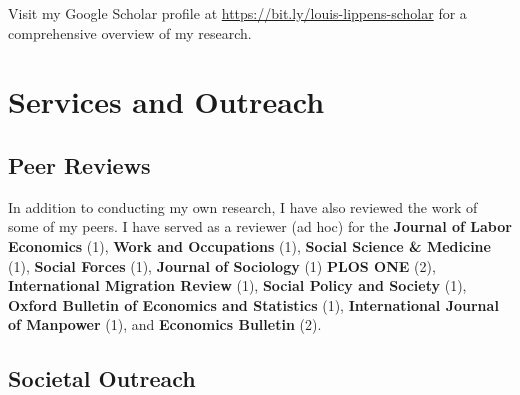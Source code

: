 \documentclass[11pt,a4paper,]{awesome-cv}
\begin{document}
\scriptsize

Visit my Google Scholar profile at
\url{https://bit.ly/louis-lippens-scholar} for a comprehensive overview
of my research. \normalsize

\hypertarget{services-and-outreach}{%
\section{Services and Outreach}\label{services-and-outreach}}

\medskip

\hypertarget{peer-reviews}{%
\subsection{Peer Reviews}\label{peer-reviews}}

\footnotesize

In addition to conducting my own research, I have also reviewed the work
of some of my peers. I have served as a reviewer (ad hoc) for the
\textbf{Journal of Labor Economics} (1), \textbf{Work and Occupations}
(1), \textbf{Social Science \& Medicine} (1), \textbf{Social Forces}
(1), \textbf{Journal of Sociology} (1) \textbf{PLOS ONE} (2),
\textbf{International Migration Review} (1), \textbf{Social Policy and
Society} (1), \textbf{Oxford Bulletin of Economics and Statistics} (1),
\textbf{International Journal of Manpower} (1), and \textbf{Economics
Bulletin} (2). \normalsize

\medskip

\hypertarget{societal-outreach}{%
\subsection{Societal Outreach}\label{societal-outreach}}
\end{document}
